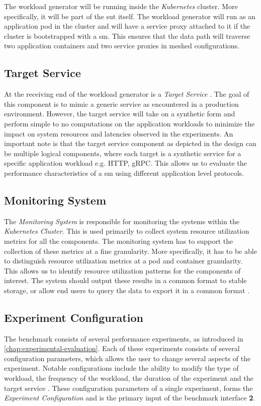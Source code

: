The workload generator will be running inside the \textit{Kubernetes} cluster. More specifically, it will be part of the \gls{sut} itself. The workload generator will run as an application \gls{pod} in the cluster and will have a service proxy attached to it if the cluster is bootstrapped with a \gls{sm}. This ensures that the data path will traverse two application containers and two service proxies in meshed configurations.

\subsection{Target Service}
At the receiving end of the workload generator is a \textit{Target Service} . The goal of this component is to mimic a generic service as encountered in a production environment. However, the target service will take on a synthetic form and perform simple to no computations on the application workloads to minimize the impact on system resources and latencies observed in the experiments. An important note is that the target service component as depicted in the design can be multiple logical components, where each target is a synthetic service for a specific application workload e.g. HTTP, gRPC. This allows us to evaluate the performance characteristics of a \gls{sm} using different application level protocols.

\subsection{Monitoring System}
The \textit{Monitoring System}  is responsible for monitoring the systems within the \textit{Kubernetes Cluster}. This is used primarily to collect system resource utilization metrics for all the components. The monitoring system has to support the collection of these metrics at a fine granularity. More specifically, it has to be able to distinguish resource utilization metrics at a pod and container granularity. This allows us to identify resource utilization patterns for the components of interest. The system should output these results in a common format to stable storage, or allow end users to query the data to export it in a common format .


\subsection{Experiment Configuration}
The benchmark consists of several performance experiments, as introduced in \cref{chap:experimental-evaluation}. Each of these experiments consists of several configuration parameters, which allows the user to change several aspects of the experiment. Notable configurations include the ability to modify the type of workload, the frequency of the workload, the duration of the experiment and the target service . These configuration parameters of a single experiment, forms the \textit{Experiment Configuration}  and is the primary input of the benchmark interface \textbf{2}.


